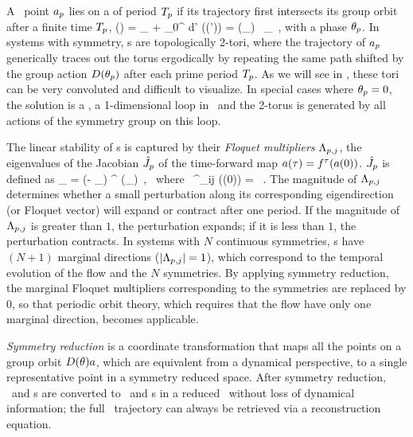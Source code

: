 \documentclass[aip,cha,
reprint,
secnumarabic,
nofootinbib, tightenlines,
nobibnotes, showkeys, showpacs,
superscriptaddress,
]{revtex4-1}
\begin{document}
A \statesp\ point $a_{p}$ lies on a \emph{\rpo} of period
${T_{p}}$ if its trajectory first intersects its group orbit after
a finite time ${T_{p}}$,
\beq
\ssp(\period{\rpprime})
    = \ssp_\rpprime
     + \int_0^\period{\rpprime} \!\!\!\!d\tau' \vel(\ssp (\tau'))
    = \matrixRep(\theta_\rpprime) \,  \ssp_\rpprime
  \,,
with a phase $\theta_{p}$. In systems with  symmetry,
\rpo s are topologically 2-tori, where the trajectory of
$a_{p}$ generically traces out the torus ergodically by
repeating the same path shifted by the group action
${D}(\theta_{p})$ after each prime period
${T_{p}}$. As we will see in , these tori
can be very convoluted and difficult to visualize. In special cases where
$\theta_{p}=0$, the solution is a \po, a 1-dimensional loop in \statesp\ and
the 2-torus is generated by all actions of the symmetry group on this
loop.

The linear stability of \rpo s is captured by their \emph{Floquet
multipliers}  $\Lambda_{p,j}$, the eigenvalues of the Jacobian $\hat{{J}}_{p}$
of the  time-forward map $a(\tau)={f^{\tau}(a(0))}$. $\hat{{J}}_{p}$ is defined as
\beq
\jMpsRed_{\rpprime}
= \matrixRep(- \theta_\rpprime ) \jMps^\period{\rpprime} (\ssp_\rpprime)
\,, \; \mbox{~where~}\;
\jMps^{\zeit}_{ij} (\ssp(0)) = \, .
The magnitude of $\Lambda_{p,j}$ determines whether a small perturbation
along its corresponding eigendirection (or Floquet vector) will expand or
contract after one period. If the magnitude of $\Lambda_{p,j}$ is
greater than $1$, the perturbation expands; if it is less than $1$, the
perturbation contracts. In systems with $N$ continuous symmetries, \rpo s
have $(N+1)$ marginal directions ($\left|\Lambda_{p,j}\right| = 1$),
which correspond to the temporal evolution of the flow and the $N$
symmetries. By applying symmetry reduction, the marginal Floquet
multipliers corresponding to the symmetries are replaced by $0$, so that
periodic orbit theory, which requires that the flow have only one
marginal direction, becomes applicable.

\emph{Symmetry reduction} is a coordinate transformation that maps
all the points on a group orbit ${D}(\theta) a$, which are
equivalent from a dynamical perspective, to a single representative point
in a symmetry reduced space. After symmetry reduction, \reqva\ and \rpo s
are converted to \eqva\ and \po s in a
reduced \statesp\ without loss of dynamical information; the full \statesp\
trajectory can always be retrieved via a reconstruction equation.
\end{document}
